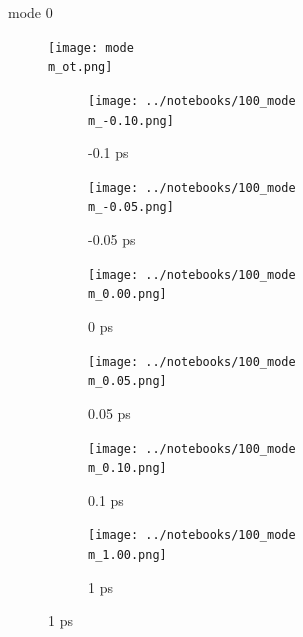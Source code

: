 \documentclass{beamer}
\begin{document}

\iftrue

\newcommand\m{0}
\newcommand\w{0.32}
\newcommand{\molwidth}{0.1}
\newcommand{\vh}{-10}
\begin{frame}{mode \m}
	\vspace{\vh mm}
	\begin{figure}
		\centering
		\texttt{[image: mode\\m\_ot.png]}
	\end{figure}
	\begin{figure}
		\centering
		\begin{subfigure}[b]{\w\textwidth}
			\centering
			\texttt{[image: ../notebooks/100\_mode\\m\_-0.10.png]}
			\caption{-0.1 ps}
			\label{fig:}
		\end{subfigure}
		\begin{subfigure}[b]{\w\textwidth}
			\centering
			\texttt{[image: ../notebooks/100\_mode\\m\_-0.05.png]}
			\caption{-0.05 ps}
			\label{fig:}
		\end{subfigure}
		\begin{subfigure}[b]{\w\textwidth}
			\centering
			\texttt{[image: ../notebooks/100\_mode\\m\_0.00.png]}
			\caption{0 ps}
			\label{fig:}
		\end{subfigure}
		\begin{subfigure}[b]{\w\textwidth}
			\centering
			\texttt{[image: ../notebooks/100\_mode\\m\_0.05.png]}
			\caption{0.05 ps}
			\label{fig:}
		\end{subfigure}
		\begin{subfigure}[b]{\w\textwidth}
			\centering
			\texttt{[image: ../notebooks/100\_mode\\m\_0.10.png]}
			\caption{0.1 ps}
			\label{fig:}
		\end{subfigure}
		\begin{subfigure}[b]{\w\textwidth}
			\centering
			\texttt{[image: ../notebooks/100\_mode\\m\_1.00.png]}
			\caption{1 ps}
			\label{fig:}
		\end{subfigure}
	\end{figure}
\end{frame}
\end{document}

